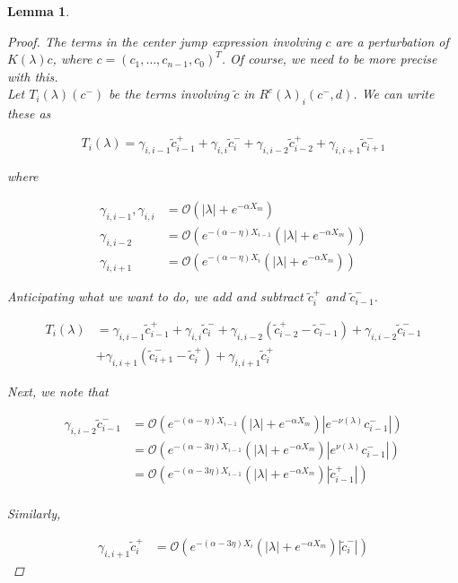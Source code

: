 \documentclass[12pt]{article}
\newtheorem{lemma}{Lemma}
\begin{document}
\begin{lemma}
\begin{proof}
The terms in the center jump expression involving $c$ are a perturbation of $K(\lambda)c$, where $c = (c_1, \dots, c_{n-1}, c_0)^T$. Of course, we need to be more precise with this.\\

Let $T_i(\lambda)(c^-)$ be the terms involving $\tilde{c}$ in $R^c(\lambda)_i(c^-, d)$. We can write these as

\[
T_i(\lambda) = \gamma_{i,i-1} \tilde{c}_{i-1}^+ + \gamma_{i,i} \tilde{c}_{i}^- + \gamma_{i,i-2} \tilde{c}_{i-2}^+ + \gamma_{i,i+1} \tilde{c}_{i+1}^-
\] 

where

\begin{align*}
\gamma_{i,i-1}, \gamma_{i,i} &= \mathcal{O}(|\lambda| + e^{-\alpha X_m}) \\
\gamma_{i,i-2} &= \mathcal{O}(e^{-(\alpha - \eta) X_{i-1}}(|\lambda| + e^{-\alpha X_m})) \\
\gamma_{i,i+1} &= \mathcal{O}(e^{-(\alpha - \eta) X_i}(|\lambda| + e^{-\alpha X_m}))
\end{align*}

Anticipating what we want to do, we add and subtract $\tilde{c}_i^+$ and $\tilde{c}_{i-1}^-$.

\begin{align*}
T_i(\lambda) &= \gamma_{i,i-1} \tilde{c}_{i-1}^+ + \gamma_{i,i} \tilde{c}_{i}^- + \gamma_{i,i-2} ( \tilde{c}_{i-2}^+ - \tilde{c}_{i-1}^-) + \gamma_{i,i-2} \tilde{c}_{i-1}^- \\
& + \gamma_{i,i+1} (\tilde{c}_{i+1}^- - \tilde{c}_i^+) + \gamma_{i,i+1} \tilde{c}_i^+
\end{align*}

Next, we note that

\begin{align*}
\gamma_{i,i-2} \tilde{c}_{i-1}^- &= \mathcal{O}(e^{-(\alpha - \eta) X_{i-1}}(|\lambda| + e^{-\alpha X_m})|e^{-\nu(\lambda)}c_{i-1}^-|) \\
&= \mathcal{O}(e^{-(\alpha - 3 \eta) X_{i-1}}(|\lambda| + e^{-\alpha X_m})|e^{\nu(\lambda)}c_{i-1}^-|) \\
&= \mathcal{O}(e^{-(\alpha - 3 \eta) X_{i-1}}(|\lambda| + e^{-\alpha X_m})|\tilde{c}_{i-1}^+|) \\
\end{align*}

Similarly,

\begin{align*}
\gamma_{i,i+1} \tilde{c}_i^+ &= \mathcal{O}(e^{-(\alpha - 3 \eta) X_i}(|\lambda| + e^{-\alpha X_m})|\tilde{c}_i^-|)
\end{align*}


\end{proof}
\end{lemma}
\end{document}
